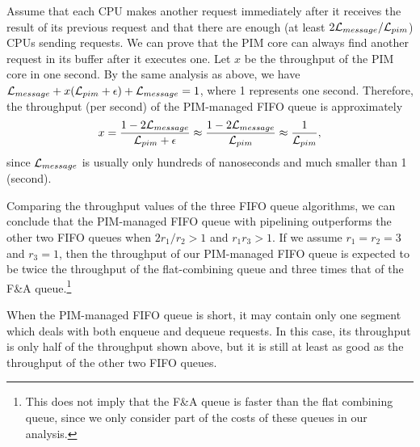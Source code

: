 Assume that each CPU makes another request immediately after it receives the result of its previous request 
and that there are enough (at least $2\mathcal{L}_{message} / \mathcal{L}_{pim}$) CPUs sending requests.
We can prove that the PIM core can always find another request in its buffer after it executes one. 
Let $x$ be the throughput of the PIM core in one second.
By the same analysis as above, we have $\mathcal{L}_{message} + x(\mathcal{L}_{pim} + \epsilon) + \mathcal{L}_{message} = 1$,  
where 1 represents one second.
Therefore, the throughput (per second) of the PIM-managed FIFO queue is approximately 
$$x = {1 - 2\mathcal{L}_{message} \over \mathcal{L}_{pim} + \epsilon} \approx {1 - 2\mathcal{L}_{message}\over \mathcal{L}_{pim}} 
\approx {1 \over \mathcal{L}_{pim}},$$
since $\mathcal{L}_{message}$ is usually only hundreds of nanoseconds and much smaller than 1 (second). 

Comparing the throughput values of the three FIFO queue algorithms, 
we can conclude that the PIM-managed FIFO queue with pipelining outperforms the other two FIFO queues 
when $2r_1 / r_2 > 1$ and $r_1 r_3 > 1$. 
If we assume $r_1 = r_2 = 3$ and $r_3 = 1$, then the throughput of our PIM-managed FIFO queue is expected to be 
twice the throughput of the flat-combining queue and three times that
of the F\&A queue.\footnote{ This does not imply that the F\&A queue is faster than the flat combining queue, 
since we only consider part of the costs of these queues in our analysis.}

When the PIM-managed FIFO queue is short, it may contain only one segment 
which deals with both enqueue and dequeue requests. 
In this case, its throughput is only half of the throughput shown above, 
but it is still at least as good as the throughput of the other two FIFO queues. 

